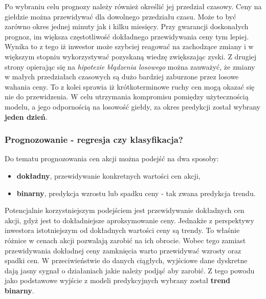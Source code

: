 \documentclass[a4paper, twoside, 11pt, openright]{article}
\begin{document}
Po wybraniu celu prognozy należy również określić jej przedział czasowy. Ceny na giełdzie można przewidywać dla dowolnego przedziału czasu. Może to być zarówno okres jednej minuty jak i kilku miesięcy. Przy gwarancji doskonałych prognoz, im większa częstotliwość dokładnego przewidywania ceny tym lepiej. Wynika to z tego iż inwestor może szybciej reagować na zachodzące zmiany i w większym stopniu wykorzystywać pozyskaną wiedzę zwiększając zyski. Z drugiej strony opierając się na \textit{hipotezie błądzenia losowego} można zauważyć, że zmiany w małych przedziałach czasowych są dużo bardziej zaburzone przez losowe wahania ceny. To z kolei sprawia iż krótkoterminowe ruchy cen mogą okazać się nie do przewidzenia. W celu utrzymania kompromisu pomiędzy użytecznością modelu, a jego odpornością na losowość giełdy, za okres predykcji został wybrany \textbf{jeden dzień}.
 
\subsubsection{Prognozowanie - regresja czy klasyfikacja?}

Do tematu prognozowania cen akcji można podejść na dwa sposoby:
\begin{itemize}
\item{\textbf{dokładny}, przewidywanie konkretnych wartości cen akcji,}
\item{\textbf{binarny}, predykcja wzrostu lub spadku ceny - tak zwana predykcja trendu.}
\end{itemize}

Potencjalnie korzystniejszym podejściem jest przewidywanie dokładnych cen akcji, gdyż jest to dokładniejsze aproksymowanie ceny. Jednakże z perspektywy inwestora istotniejszym od dokładnych wartości ceny są trendy. To właśnie różnice w cenach akcji pozwalają zarobić na ich obrocie. Wobec tego zamiast przewidywania dokładnej ceny zamknięcia warto przewidywać wzrosty oraz spadki cen. W przeciwieństwie do danych ciągłych, wyjściowe dane dyskretne  dają jasny sygnał o działaniach jakie należy podjąć aby zarobić. Z tego powodu jako podstawowe wyjście z modeli predykcyjnych wybrany został \textbf{trend binarny}.

\bigskip
\end{document}
